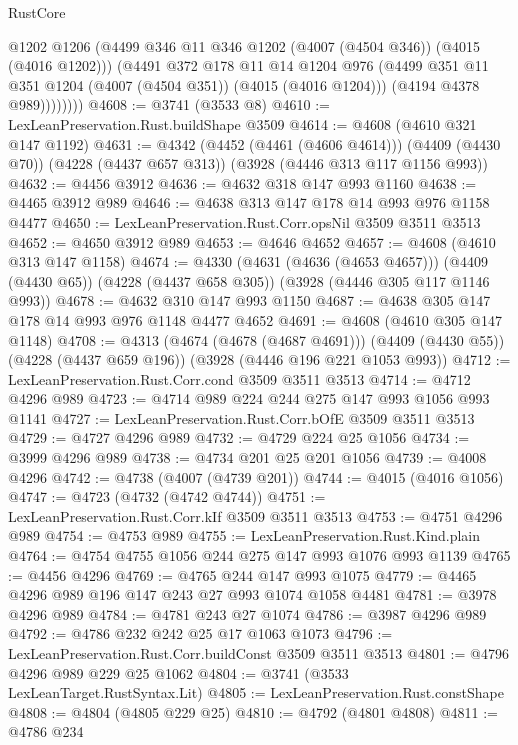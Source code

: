 \begin{lexlean}{RustCore}
\begin{coremodule}
                @1202
                @1206
                (@4499 @346 @11 @346 @1202 (@4007 (@4504 @346)) (@4015 (@4016 @1202)))
                (@4491
                  @372
                  @178
                  @11
                  @14
                  @1204
                  @976
                  (@4499 @351 @11 @351 @1204 (@4007 (@4504 @351)) (@4015 (@4016 @1204)))
                  (@4194 @4378 @989))))))))
@4608 := @3741 (@3533 @8)
@4610 := LexLeanPreservation.Rust.buildShape @3509
@4614 := @4608 (@4610 @321 @147 @1192)
@4631 := @4342
    (@4452 (@4461 (@4606 @4614)))
    (@4409 (@4430 @70))
    (@4228 (@4437 @657 @313))
    (@3928 (@4446 @313 @117 @1156 @993))
@4632 := @4456 @3912
@4636 := @4632 @318 @147 @993 @1160
@4638 := @4465 @3912 @989
@4646 := @4638 @313 @147 @178 @14 @993 @976 @1158 @4477
@4650 := LexLeanPreservation.Rust.Corr.opsNil @3509 @3511 @3513
@4652 := @4650 @3912 @989
@4653 := @4646 @4652
@4657 := @4608 (@4610 @313 @147 @1158)
@4674 := @4330
    (@4631 (@4636 (@4653 @4657)))
    (@4409 (@4430 @65))
    (@4228 (@4437 @658 @305))
    (@3928 (@4446 @305 @117 @1146 @993))
@4678 := @4632 @310 @147 @993 @1150
@4687 := @4638 @305 @147 @178 @14 @993 @976 @1148 @4477 @4652
@4691 := @4608 (@4610 @305 @147 @1148)
@4708 := @4313
    (@4674 (@4678 (@4687 @4691)))
    (@4409 (@4430 @55))
    (@4228 (@4437 @659 @196))
    (@3928 (@4446 @196 @221 @1053 @993))
@4712 := LexLeanPreservation.Rust.Corr.cond @3509 @3511 @3513
@4714 := @4712 @4296 @989
@4723 := @4714 @989 @224 @244 @275 @147 @993 @1056 @993 @1141
@4727 := LexLeanPreservation.Rust.Corr.bOfE @3509 @3511 @3513
@4729 := @4727 @4296 @989
@4732 := @4729 @224 @25 @1056
@4734 := @3999 @4296 @989
@4738 := @4734 @201 @25 @201 @1056
@4739 := @4008 @4296
@4742 := @4738 (@4007 (@4739 @201))
@4744 := @4015 (@4016 @1056)
@4747 := @4723 (@4732 (@4742 @4744))
@4751 := LexLeanPreservation.Rust.Corr.kIf @3509 @3511 @3513
@4753 := @4751 @4296 @989
@4754 := @4753 @989
@4755 := LexLeanPreservation.Rust.Kind.plain
@4764 := @4754 @4755 @1056 @244 @275 @147 @993 @1076 @993 @1139
@4765 := @4456 @4296
@4769 := @4765 @244 @147 @993 @1075
@4779 := @4465 @4296 @989 @196 @147 @243 @27 @993 @1074 @1058 @4481
@4781 := @3978 @4296 @989
@4784 := @4781 @243 @27 @1074
@4786 := @3987 @4296 @989
@4792 := @4786 @232 @242 @25 @17 @1063 @1073
@4796 := LexLeanPreservation.Rust.Corr.buildConst @3509 @3511 @3513
@4801 := @4796 @4296 @989 @229 @25 @1062
@4804 := @3741 (@3533 LexLeanTarget.RustSyntax.Lit)
@4805 := LexLeanPreservation.Rust.constShape
@4808 := @4804 (@4805 @229 @25)
@4810 := @4792 (@4801 @4808)
@4811 := @4786 @234

\end{coremodule}
\end{lexlean}
